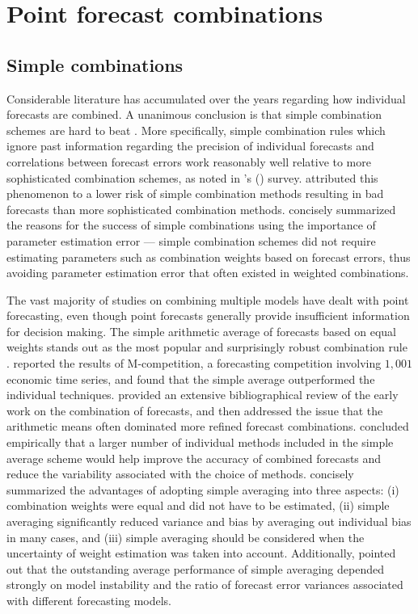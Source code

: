 \documentclass[11pt]{article}
\def\citeapos#1{\citeauthor{#1}'s (\citeyear{#1})}
\begin{document}
\section{Point forecast combinations}
\label{sec:point_forecast_combinations}

\subsection{Simple combinations}
\label{sec:simple_combinations}

Considerable literature has accumulated over the years regarding how individual forecasts are combined. A unanimous conclusion is that simple combination schemes are hard to beat \citep{Clemen1989-fb,Fischer1999-kz,Stock2004-rq,Lichtendahl2020-ut}. More specifically, simple combination rules which ignore past information regarding the precision of individual forecasts and correlations between forecast errors work reasonably well relative to more sophisticated combination schemes, as noted in \citeapos{Clemen1989-fb} survey. \cite{Lichtendahl2020-ut} attributed this phenomenon to a lower risk of simple combination methods resulting in bad forecasts than more sophisticated combination methods. \cite{Timmermann2006-en} concisely summarized the reasons for the success of simple combinations using the importance of parameter estimation error --- simple combination schemes did not require estimating parameters such as combination weights based on forecast errors, thus avoiding parameter estimation error that often existed in weighted combinations.

The vast majority of studies on combining multiple models have dealt with point forecasting, even though point forecasts generally provide insufficient information for decision making. The simple arithmetic average of forecasts based on equal weights stands out as the most popular and surprisingly robust combination rule \citep[see][]{Bunn1985-vo,Clemen1986-pd,Stock2003-sp,Genre2013-ut}. \cite{Makridakis1982-hb} reported the results of M-competition, a forecasting competition involving $1,001$ economic time series, and found that the simple average outperformed the individual techniques. \cite{Clemen1989-fb} provided an extensive bibliographical review of the early work on the combination of forecasts, and then addressed the issue that the arithmetic means often dominated more refined forecast combinations. \cite{Makridakis1983-hg} concluded empirically that a larger number of individual methods included in the simple average scheme would help improve the accuracy of combined forecasts and reduce the variability associated with the choice of methods. \cite{Palm1992-im} concisely summarized the advantages of adopting simple averaging into three aspects: (i) combination weights were equal and did not have to be estimated, (ii) simple averaging significantly reduced variance and bias by averaging out individual bias in many cases, and (iii) simple averaging should be considered when the uncertainty of weight estimation was taken into account. Additionally, \cite{Timmermann2006-en} pointed out that the outstanding average performance of simple averaging depended strongly on model instability and the ratio of forecast error variances associated with different forecasting models.
\end{document}
